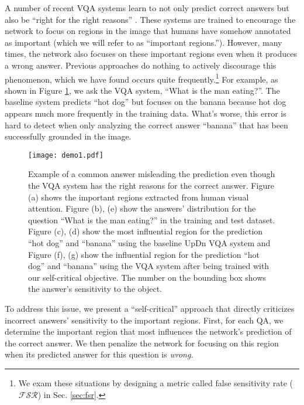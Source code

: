 \documentclass{article}
\begin{document}
A number of recent VQA systems \cite{trott2017interpretable,zhang2019interpretable,selvaraju2019taking,qiao2018exploring} learn to not only predict correct answers but also be ``right for the right reasons'' \cite{ross2017right,selvaraju2019taking}. These systems are trained to encourage the network to focus on regions in the image that humans have somehow annotated as important (which we will refer to as ``important regions.''). However, many times, the network also focuses on these important regions even when it produces a wrong answer.  Previous approaches do nothing to actively discourage this phenomenon, which we have found occurs quite frequently.\footnote{We exam these situations by designing a metric called false sensitivity rate ($\mathcal{FSR}$) in Sec. \ref{sec:fsr}.}   
For example, as shown in Figure \ref{fig:demo}, we ask the VQA system, ``What is the man eating?''. The baseline system predicts ``hot dog'' but focuses on the banana because hot dog appears much more frequently in the training data. What's worse, this error is hard to detect when only analyzing the correct answer ``banana'' that has been successfully grounded in the image.


\begin{figure}[!t]
    \centering
    \texttt{[image: demo1.pdf]}
    \caption{Example of a common answer misleading the prediction even though the VQA system has the right reasons for the correct answer. Figure (a) shows the important regions extracted from human visual attention. Figure (b), (e) show the answers' distribution for the question ``What is the man eating?'' in the training and test dataset.  Figure (c), (d) show the most influential region for the prediction ``hot dog'' and ``banana'' using the baseline UpDn VQA system and Figure (f), (g) show the influential region for the prediction ``hot dog'' and ``banana'' using the VQA system after being trained with our self-critical objective. The number on the bounding box shows the answer's sensitivity to the object.}
    \label{fig:demo}
\end{figure}

To address this issue, we present a ``self-critical'' approach that directly criticizes incorrect answers' sensitivity to the important regions.  First, for each QA, we determine the important region that most influences the network's prediction of the correct answer. We then penalize the network for focusing on this region when its predicted answer for this question is {\it wrong}.  
\end{document}

